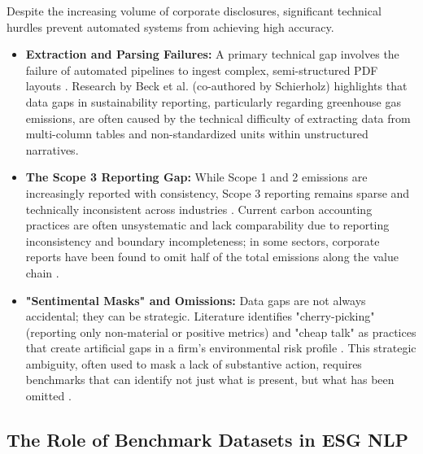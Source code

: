 \documentclass[english, online, cse, master]{dithesis}
\begin{document}
Despite the increasing volume of corporate disclosures, significant technical hurdles prevent automated systems from achieving high accuracy.
\begin{itemize}
\item 

\textbf{Extraction and Parsing Failures:} A primary technical gap involves the failure of automated pipelines to ingest complex, semi-structured PDF layouts  \parencite{marco_bronzini_bf94d949}. Research by Beck et al.  \parencite{jacob_beck_9548a833} (co-authored by Schierholz) highlights that data gaps in sustainability reporting, particularly regarding greenhouse gas emissions, are often caused by the technical difficulty of extracting data from multi-column tables and non-standardized units within unstructured narratives.\item 

\textbf{The Scope 3 Reporting Gap:} While Scope 1 and 2 emissions are increasingly reported with consistency, Scope 3 reporting remains sparse and technically inconsistent across industries  \parencite{jacob_beck_9548a833}. Current carbon accounting practices are often unsystematic and lack comparability due to reporting inconsistency and boundary incompleteness; in some sectors, corporate reports have been found to omit half of the total emissions along the value chain  \parencite{lena_klaa_en_b073191d}.\item 

\textbf{"Sentimental Masks" and Omissions:} Data gaps are not always accidental; they can be strategic. Literature identifies "cherry-picking" (reporting only non-material or positive metrics) and "cheap talk" as practices that create artificial gaps in a firm’s environmental risk profile  \parencite[]{julia_bingler_6b484913, julia_bingler_268445e3}. This strategic ambiguity, often used to mask a lack of substantive action, requires benchmarks that can identify not just what is present, but what has been omitted  \parencite[]{julia_bingler_268445e3, keane_ong_369a0b63}.
\end{itemize}

\subsection{The Role of Benchmark Datasets in ESG NLP}
\end{document}
